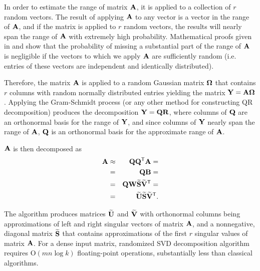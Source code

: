 In order to estimate the range of matrix $\mathbf{A}$, it is applied to a collection of $r$ random vectors. The result of applying $\mathbf{A}$ to any vector is a vector in the range of $\mathbf{A}$, and if the matrix is applied to $r$ random vectors, the results will nearly span the range of $\mathbf{A}$ with extremely high probability. Mathematical proofs given in \cite{Halko2011} and \cite{Witten2015} show that the probability of missing a substantial part of the range of $\mathbf{A}$ is negligible if the vectors to which we apply $\mathbf{A}$ are sufficiently random (i.e. entries of these vectors are independent and identically distributed).

Therefore, the matrix $\mathbf{A}$ is applied to a random Gaussian matrix $\mathbf{\Omega}$ that contains $r$ columns with random normally distributed entries yielding the matrix $\mathbf{Y} = \mathbf{A} \mathbf{\Omega}$. Applying the Gram-Schmidt process (or any other method for constructing QR decomposition) produces the decomposition $\mathbf{Y}=\mathbf{Q}\mathbf{R}$, where columns of $\mathbf{Q}$ are an orthonormal basis for the range of $\mathbf{Y}$, and since columns of $\mathbf{Y}$ nearly span the range of $\mathbf{A}$, $\mathbf{Q}$ is an orthonormal basis for the approximate range of $\mathbf{A}$.

$\mathbf{A}$ is then decomposed as
\begin{eqnarray}
\mathbf{A} &\approx& \mathbf{Q}\mathbf{Q}^{\mathsf{T}}\mathbf{A} =
\\
&=& \mathbf{Q}\mathbf{B} = \nonumber
\\
&=& \mathbf{Q}\mathbf{W}\mathbf{\widetilde{S}}\mathbf{\widetilde{V}}^{\mathsf{T}} = \nonumber
\\
&=& \mathbf{\widetilde{U}}\mathbf{\widetilde{S}}\mathbf{\widetilde{V}}^{\mathsf{T}}. \nonumber
\end{eqnarray}

\noindent
The algorithm produces matrices $\mathbf{\widetilde{U}}$ and $\mathbf{\widetilde{V}}$ with orthonormal columns being approximations of left and right singular vectors of matrix $\mathbf{A}$, and a nonnegative, diagonal matrix $\mathbf{\widetilde{S}}$ that contains approximations of the first $r$ singular values of matrix $\mathbf{A}$. For a dense input matrix, randomized SVD decomposition algorithm requires $\mathrm{O}(mn \log{k})$ floating-point operations, substantially less than classical algorithms.
